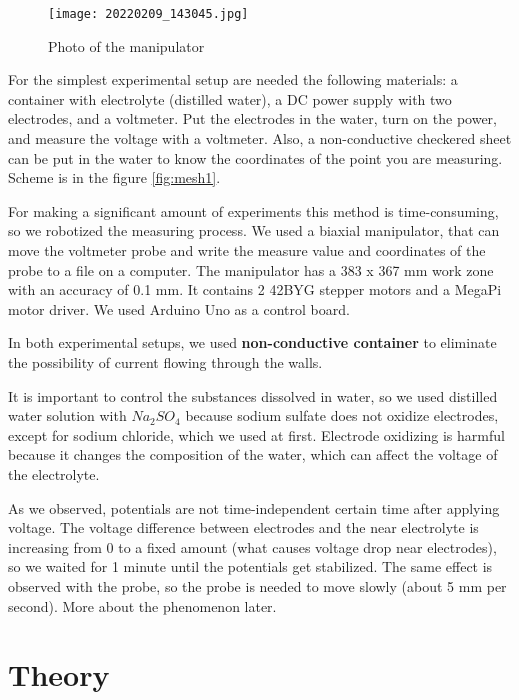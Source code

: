 \documentclass{article}
\begin{document}
\begin{figure}[h]
	\begin{center}
		\texttt{[image: 20220209\_143045.jpg]}
		\caption{Photo of the manipulator}
		\label{manipulator_photo}
	\end{center}
\end{figure}



For the simplest experimental setup are needed the following materials: a container with electrolyte (distilled water), a DC power supply with two electrodes, and a voltmeter. Put the electrodes in the water, turn on the power, and measure the voltage with a voltmeter. Also, a non-conductive checkered sheet can be put in the water to know the coordinates of the point you are measuring. Scheme is in the figure \ref{fig:mesh1}.  \par

For making a significant amount of experiments this method is time-consuming, so we robotized the measuring process. We used a biaxial manipulator, that can move the voltmeter probe and write the measure value and coordinates of the probe to a file on a computer. The manipulator has a 383 x 367 mm work zone with an accuracy of 0.1 mm. It contains 2 42BYG stepper motors and a MegaPi motor driver. We used Arduino Uno as a control board.


In both experimental setups, we used \textbf{non-conductive container} to eliminate the possibility of current flowing through the walls.\par

It is important to control the substances dissolved in water, so we used distilled water solution with $Na_2SO_4$ because sodium sulfate does not oxidize electrodes, except for sodium chloride, which we used at first. Electrode oxidizing is harmful because it changes the composition of the water, which can affect the voltage of the electrolyte.\par

As we observed, potentials are not time-independent certain time after applying voltage. The voltage difference between electrodes and the near electrolyte is increasing from 0 to a fixed amount (what causes voltage drop near electrodes), so we waited for 1 minute until the potentials get stabilized. The same effect is observed with the probe, so the probe is needed to move slowly (about 5 mm per second). More about the phenomenon later. \par


\section{Theory}
\end{document}
